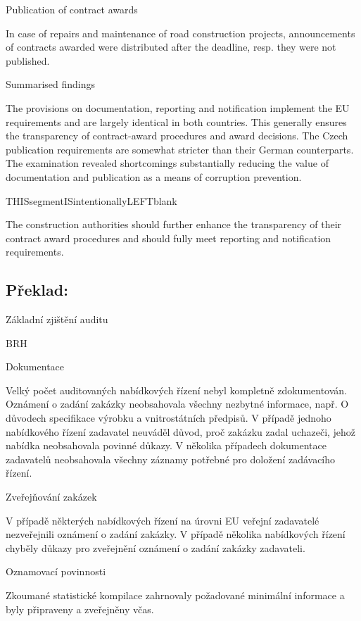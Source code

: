 \documentclass[10pt]{article}
\begin{document}
Publication of contract awards

In case of repairs and maintenance of road construction projects, announcements of contracts awarded were distributed after the deadline, resp. they were not published.


Summarised findings

The provisions on documentation, reporting and notification implement the EU requirements and are largely identical in both countries.
This generally ensures the transparency of contract-award procedures and award decisions.
The Czech publication requirements are somewhat stricter than their German counterparts.
The examination revealed shortcomings substantially reducing the value of documentation and publication as a means of corruption prevention.


THISsegmentISintentionallyLEFTblank

The construction authorities should further enhance the transparency of their contract award procedures and should fully meet reporting and notification requirements.


\pagebreak

\subsection*{Překlad:}



Základní zjištění auditu



BRH



Dokumentace

Velký počet auditovaných nabídkových řízení nebyl kompletně zdokumentován.
Oznámení o zadání zakázky neobsahovala všechny nezbytné informace, např. O důvodech specifikace výrobku a vnitrostátních předpisů.
V případě jednoho nabídkového řízení zadavatel neuváděl důvod, proč zakázku zadal uchazeči, jehož nabídka neobsahovala povinné důkazy.
V několika případech dokumentace zadavatelů neobsahovala všechny záznamy potřebné pro doložení zadávacího řízení.


Zveřejňování zakázek

V případě některých nabídkových řízení na úrovni EU veřejní zadavatelé nezveřejnili oznámení o zadání zakázky.
V případě několika nabídkových řízení chyběly důkazy pro zveřejnění oznámení o zadání zakázky zadavateli.


Oznamovací povinnosti

Zkoumané statistické kompilace zahrnovaly požadované minimální informace a byly připraveny a zveřejněny včas.
\end{document}
